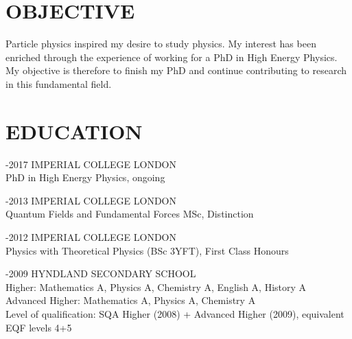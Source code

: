 \documentclass[9pt]{res} %
\begin{document}
 
 
\vspace{0.2cm}
\address{ \\44 Rue de la Combette\\ St Genis-Pouilly\\ France. 01630\\	matthew.citron09@imperial.ac.uk}
 
                                             
\begin{resume}
                                               
 
\section{OBJECTIVE}
\vspace{0.2cm}
    Particle physics inspired my desire to study physics. My interest has been enriched through the experience of working for a PhD in High Energy Physics. My objective is therefore to finish my PhD and continue contributing to research in this fundamental field.
   
\section{EDUCATION} 

\vspace{0.2cm}

-2017 IMPERIAL COLLEGE LONDON \\
PhD in High Energy Physics, ongoing 

-2013 IMPERIAL COLLEGE LONDON \\
 Quantum Fields and Fundamental Forces MSc, Distinction

-2012 IMPERIAL COLLEGE LONDON \\
Physics with Theoretical Physics (BSc 3YFT), First Class Honours 

-2009 HYNDLAND SECONDARY SCHOOL \\
Higher: Mathematics A, Physics A, Chemistry A, English A, History A \\
Advanced Higher: Mathematics A, Physics A, Chemistry A  \\
Level of qualification: SQA Higher (2008) + Advanced Higher (2009), equivalent EQF levels 4+5 \\
 

\end{resume}
\end{document}
